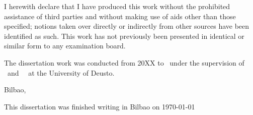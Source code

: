 



\ifpdf
    \graphicspath{{9_backmatter/figures/PNG/}{9_backmatter/figures/PDF/}{9_backmatter/figures/}}
\else
    \graphicspath{{9_backmatter/figures/EPS/}{9_backmatter/figures/}}
\fi



\begin{declaration}        %

I herewith declare that I have produced this work without the prohibited assistance of third parties and without making use of aids other than those specified; notions taken over directly or indirectly from other sources have been identified as such. This work has not previously been presented in identical or similar form to any examination board.

The dissertation work was conducted from 20XX to \the\year \ under the supervision of
\Advisor 
~and~
\Advisortwo
~at 
the University of Deusto.

\vspace{10mm}

Bilbao,




\end{declaration}




\thispagestyle{empty}

\hfill
\vfill
\medskip

\begin{center}
\noindent
This dissertation was finished writing 
in 
Bilbao
on
\today 
\end{center}

